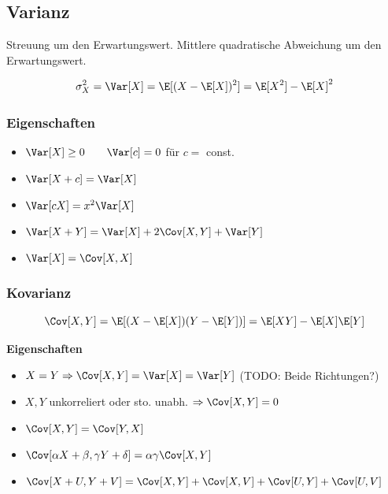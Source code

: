\subsection{Varianz}
Streuung um den Erwartungswert. Mittlere quadratische Abweichung um den Erwartungswert.
\begin{emphbox}
    \begin{equation*}
        \sigma_X^2 = \Var[X] = \E[(X-\E[X])^2]=\E[X^2]-\E[X]^2
    \end{equation*}
\end{emphbox}

\begin{sectionbox}
    \subsubsection{Eigenschaften}
    \begin{itemize}
        \item $\Var[X] \ge 0 \qquad \Var[c] = 0$ für $c=$ const.
        \item $\Var[X+c] = \Var[X]$
        \item $\Var[cX] = x^2\Var[X]$
        \item $\Var[X+Y] = \Var[X] + 2\Cov[X,Y] + \Var[Y]$
        \item $\Var[X]=\Cov[X,X]$
    \end{itemize}
\end{sectionbox}

\begin{sectionbox}
    \subsubsection{Kovarianz}
    \begin{emphbox}
        \begin{equation*}
            \Cov[X,Y]=\E[(X-\E[X])(Y-\E[Y])]=\E[XY]-\E[X]\E[Y]
        \end{equation*}
    \end{emphbox}

    \textbf{Eigenschaften}
    \begin{itemize}
        \item $X=Y \Rightarrow \Cov[X,Y]=\Var[X]=\Var[Y]$ (TODO: Beide Richtungen?)
        \item $X,Y$ unkorreliert oder sto. unabh. $\Rightarrow \Cov[X,Y]=0$
        \item $\Cov[X,Y]=\Cov[Y,X]$
        \item $\Cov[\alpha X + \beta, \gamma Y + \delta]=\alpha\gamma\Cov[X,Y]$
        \item $\Cov[X+U, Y+V] = \Cov[X,Y] + \Cov[X,V] + \Cov[U,Y] + \Cov[U,V]$
    \end{itemize}
    

\end{sectionbox}

